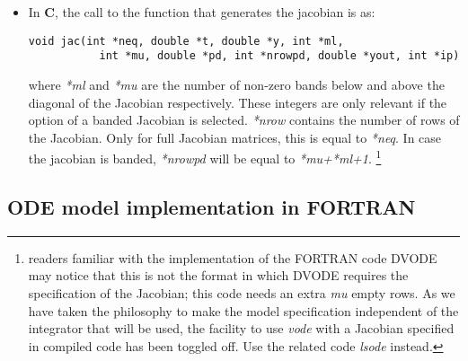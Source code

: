 \documentclass[english]{article}
\newcommand{\FOR}{\textbf{\textsf{FORTRAN}}\xspace}
\newcommand{\C}{\textbf{\textsf{C}}\xspace}
\begin{document}
\begin{itemize}
Note that, in function \emph{derivs}, we start by checking whether enough room is allocated for the output variables ("if (ip[0] <1)"), 
else an error is passed to R and the integration is stopped.
\item In \C, the call to the function that generates the jacobian is as:
\begin{verbatim}
void jac(int *neq, double *t, double *y, int *ml,
           int *mu, double *pd, int *nrowpd, double *yout, int *ip)
\end{verbatim}
where \emph{*ml} and \emph{*mu} are the number of non-zero bands below and above
the diagonal of the Jacobian respectively. These integers are only relevant if the option of a 
banded Jacobian is selected. \emph{*nrow} contains the number of rows of the Jacobian.
Only for full Jacobian matrices, this is equal to \emph{*neq}. In case the 
jacobian is banded, \emph{*nrowpd} will be equal to \emph{*mu+*ml+1}. 
\footnote{readers familiar with the implementation of the FORTRAN code DVODE may notice that 
this is not the format in which DVODE requires the specification of the Jacobian; 
this code needs an extra \emph{mu} empty rows. As we have taken the philosophy to make 
the model specification independent of the integrator that will be used, the facility
to use \emph{vode} with a Jacobian specified in compiled code has been toggled off. 
Use the related code \emph{lsode} instead.}
\end{itemize}



\subsection{ODE model implementation in \FOR}
  
\end{document}

